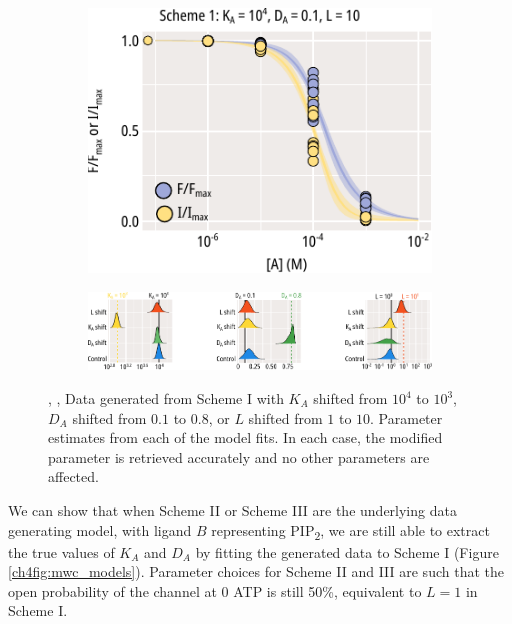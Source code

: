 \begin{figure}[h]
\begin{subfigure}[t]{0.3\textwidth}
		\centering
		\includegraphics[width=\textwidth]{mwc_scheme_1_l_shift.pdf}
	\end{subfigure}
	\vfill
	\begin{subfigure}[t]{0.9\textwidth}
		\caption{}\label{ch4fig:mwc_params_2}
		\centering
		\includegraphics[width=\textwidth]{mwc_scheme_param_fits_2.pdf}
	\end{subfigure}
	\caption[Parameter retrieval from MWC models]{
	, ,  Data generated from Scheme I with  $K_A$ shifted from $10^4$ to $10^3$,  $D_A$ shifted from $0.1$ to $0.8$, or  $L$ shifted from $1$ to $10$.
	 Parameter estimates from each of the model fits.
	In each case, the modified parameter is retrieved accurately and no other parameters are affected.
	}\label{ch4fig:scheme_1_shifts}
\end{figure}

We can show that when Scheme II or Scheme III are the underlying data generating model, with ligand $B$ representing PIP\textsubscript{2}, we are still able to extract the true values of $K_A$ and $D_A$ by fitting the generated data to Scheme I (Figure \ref{ch4fig:mwc_models}).
Parameter choices for Scheme II and III are such that the open probability of the channel at \SI{0}{\Molar} ATP is still 50\%, equivalent to $L=1$ in Scheme I.

